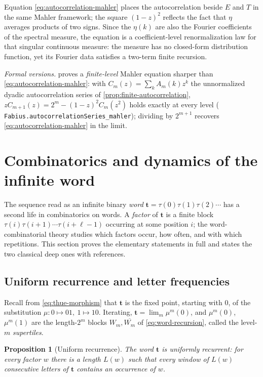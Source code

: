 \documentclass[11pt,oneside]{article}
\numberwithin{equation}{section}
\newtheorem{proposition}[theorem]{Proposition}
\theoremstyle{definition}
\theoremstyle{remark}
\newcommand{\lean}[1]{%
  \ifmmode\text{\nolinkurl{#1}}\else\nolinkurl{#1}\fi}
\begin{document}
Equation \eqref{eq:autocorrelation-mahler} places the autocorrelation beside
\(E\) and \(T\) in the same Mahler framework; the square \((1-z)^2\)
reflects the fact that \(\eta\) averages products of two signs.  Since the
\(\eta(k)\) are also the Fourier coefficients of the spectral measure, the
equation is a coefficient-level renormalization law for that singular
continuous measure: the measure has no closed-form distribution function,
yet its Fourier data satisfies a two-term finite recursion.

\emph{Formal versions.}   proves a
\emph{finite-level} Mahler equation sharper than
\eqref{eq:autocorrelation-mahler}: with
\(C_m(z)=\sum_kA_m(k)z^k\) the unnormalized dyadic autocorrelation
series of \cref{prop:finite-autocorrelation},
\(zC_{m+1}(z)=2^m-(1-z)^2C_m(z^2)\) holds exactly at every level
(\lean{Fabius.autocorrelationSeries\_mahler}); dividing by
\(2^{m+1}\) recovers \eqref{eq:autocorrelation-mahler} in the limit.

\section[Word combinatorics and dynamics]{Combinatorics and dynamics of the infinite word}
\label{sec:words-dynamics}

The sequence read as an infinite binary \emph{word}
\(\mathbf t=\tau(0)\tau(1)\tau(2)\cdots\) has a second life in combinatorics
on words.  A \emph{factor} of \(\mathbf t\) is a finite block
\(\tau(i)\tau(i+1)\cdots\tau(i+\ell-1)\) occurring at some position \(i\);
the word-combinatorial theory studies which factors occur, how often, and
with which repetitions.  This section proves the elementary statements in
full and states the two classical deep ones with references.

\subsection{Uniform recurrence and letter frequencies}

Recall from \eqref{eq:thue-morphism} that \(\mathbf t\) is the fixed point,
starting with \(0\), of the substitution
\(\mu:0\mapsto01,\ 1\mapsto10\).  Iterating,
\(\mathbf t=\lim_m\mu^m(0)\), and \(\mu^m(0)\), \(\mu^m(1)\) are the
length-\(2^m\) blocks \(W_m,\overline{W_m}\) of
\eqref{eq:word-recursion}, called the level-\(m\) \emph{supertiles}.

\begin{proposition}[Uniform recurrence]
\label{prop:uniform-recurrence}
The word \(\mathbf t\) is \emph{uniformly recurrent}: for every factor
\(w\) there is a length \(L(w)\) such that every window of \(L(w)\)
consecutive letters of \(\mathbf t\) contains an occurrence of \(w\).
\end{proposition}
\end{document}
